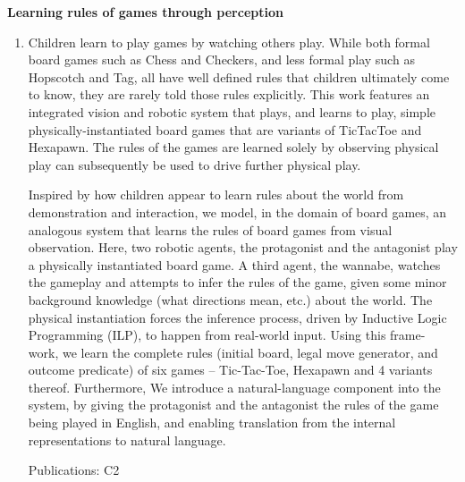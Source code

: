 \documentclass[10pt]{article}
\newenvironment{researchBlock}[1]{%
  \vspace*{0.5ex}
  {\large \textbf{#1}}
  \begin{enumerate}\item[]}
  {\end{enumerate}}
\newcommand{\refr}[1]{{\color{RoyalBlue} #1}}
\begin{document}
\begin{researchBlock} {Learning rules of games through perception}

  Children learn to play games by watching others play. While both formal board
  games such as Chess and Checkers, and less formal play such as Hopscotch and
  Tag, all have well defined rules that children ultimately come to know, they
  are rarely told those rules explicitly. This work features an integrated
  vision and robotic system that plays, and learns to play, simple
  physically-instantiated board games that are variants of TicTacToe and
  Hexapawn. The rules of the games are learned solely by observing physical
  play can subsequently be used to drive further physical play.

  Inspired by how children appear to learn rules about the world from
  demonstration and interaction, we model, in the domain of board games, an
  analogous system that learns the rules of board games from visual
  observation.
  Here, two robotic agents, the protagonist and the antagonist play a physically
  instantiated board game.
  A third agent, the wannabe, watches the gameplay and attempts to infer the
  rules of the game, given some minor background knowledge (what directions mean,
  etc.) about the world.
  The physical instantiation forces the inference process, driven by Inductive
  Logic Programming (ILP), to happen from real-world input.
  Using this frame- work, we learn the complete rules (initial board, legal move
  generator, and outcome predicate) of six games -- Tic-Tac-Toe, Hexapawn and 4
  variants thereof.
  Furthermore, We introduce a natural-language component into the system, by
  giving the protagonist and the antagonist the rules of the game being played in
  English, and enabling translation from the internal representations to natural
  language.

  Publications: \refr{C2}
\end{researchBlock}
\end{document}
